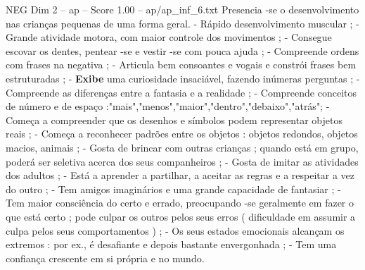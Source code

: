 \begin{textsample}{NEG Dim 2 – ap – Score 1.00 – ap/ap\_inf\_6.txt}
Presencia -se o desenvolvimento nas crianças pequenas de uma forma geral. - Rápido desenvolvimento muscular ; - Grande atividade motora, com maior controle dos movimentos ; - Consegue escovar os dentes, pentear -se e vestir -se com pouca ajuda ; - Compreende ordens com frases na negativa ; - Articula bem consoantes e vogais e constrói frases bem estruturadas ; - \textbf{Exibe} uma curiosidade insaciável, fazendo inúmeras perguntas ; - Compreende as diferenças entre a fantasia e a realidade ; - Compreende conceitos de número e de espaço :"mais","menos","maior","dentro","debaixo","atrás"; - Começa a compreender que os desenhos e símbolos podem representar objetos reais ; - Começa a reconhecer padrões entre os objetos : objetos redondos, objetos macios, animais ; - Gosta de brincar com outras crianças ; quando está em grupo, poderá ser seletiva acerca dos seus companheiros ; - Gosta de imitar as atividades dos adultos ; - Está a aprender a partilhar, a aceitar as regras e a respeitar a vez do outro ; - Tem amigos imaginários e uma grande capacidade de fantasiar ; - Tem maior consciência do certo e errado, preocupando -se geralmente em fazer o que está certo ; pode culpar os outros pelos seus erros ( dificuldade em assumir a culpa pelos seus comportamentos ) ; - Os seus estados emocionais alcançam os extremos : por ex., é desafiante e depois bastante envergonhada ; - Tem uma confiança crescente em si própria e no mundo.

\end{textsample}
